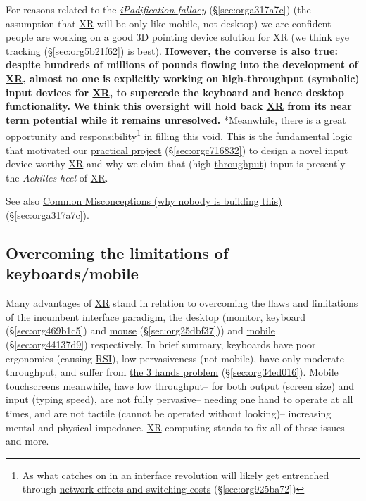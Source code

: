 \documentclass[logo,bsc,singlespacing,parskip]{infthesis}
\begin{document}
For reasons related to the \emph{\hyperref[ipadification fallacy]{iPadification fallacy}} (\S \ref{sec:orga317a7c}) (the assumption that \hyperref[org53dbe83]{XR} will be only like mobile, not desktop) we are confident people are working on a good 3D pointing device solution for \hyperref[org53dbe83]{XR} (we think \hyperref[sec:org5b21f62]{eye tracking} (\S \ref{sec:org5b21f62}) is best).
\textbf{However, the converse is also true: despite hundreds of millions of pounds flowing into the development of \hyperref[org53dbe83]{XR}, almost no one is explicitly working on high-throughput (symbolic) input devices for \hyperref[org53dbe83]{XR}, to supercede the keyboard and hence desktop functionality.}
\textbf{We think this oversight will hold back \hyperref[org53dbe83]{XR} from its near term potential while it remains unresolved.}
*Meanwhile, there is a great opportunity and responsibility\footnote{As what catches on in an interface revolution will likely get entrenched through \hyperref[sec:org925ba72]{network effects and switching costs} (\S \ref{sec:org925ba72})} in filling this void.
This is the fundamental logic that motivated our \hyperref[sec:orgc716832]{practical project} (\S \ref{sec:orgc716832}) to design a novel input device worthy \hyperref[org53dbe83]{XR} and why we claim that (high-\hyperref[throughput]{throughput}) input is presently the \emph{Achilles heel} of \hyperref[org53dbe83]{XR}.

See also \hyperref[sec:orga317a7c]{Common Misconceptions (why nobody is building this)} (\S \ref{sec:orga317a7c}).
\subsection{Overcoming the limitations of keyboards/mobile}
\label{sec:org588b68e}
Many advantages of \hyperref[org53dbe83]{XR} stand in relation to overcoming the flaws and limitations of the incumbent interface paradigm, the desktop (monitor, \hyperref[sec:org469b1c5]{keyboard} (\S \ref{sec:org469b1c5}) and \hyperref[sec:org25dbf37]{mouse} (\S \ref{sec:org25dbf37})) and \hyperref[sec:org44137d9]{mobile} (\S \ref{sec:org44137d9}) respectively.
In brief summary, keyboards have poor ergonomics (causing \hyperref[orgafdb7af]{RSI}), low pervasiveness (not mobile), have only moderate throughput, and suffer from \hyperref[sec:org34ed016]{the 3 hands problem} (\S \ref{sec:org34ed016}).
Mobile touchscreens meanwhile, have low throughput-- for both output (screen size) and input (typing speed), are not fully pervasive-- needing one hand to operate at all times, and are not tactile (cannot be operated without looking)-- increasing mental and physical impedance.
\hyperref[org53dbe83]{XR} computing stands to fix all of these issues and more.
\end{document}
